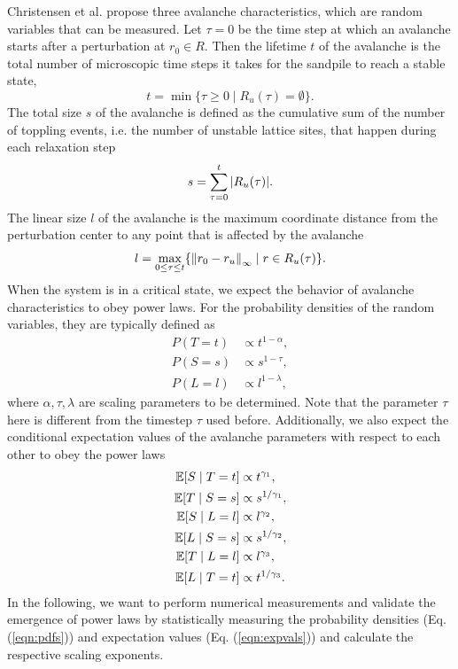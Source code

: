 Christensen et al. \cite{christensen1991dynamical} propose three avalanche characteristics, which are random variables that can be measured. Let $\tau=0$ be the time step at which an avalanche starts after a perturbation at $r_0\in R$. Then the lifetime $t$ of the avalanche is the total number of microscopic time steps it takes for the sandpile to reach a stable state,
\begin{equation}
    t = \min\{\tau\geq0 \mid R_u(\tau) = \emptyset\}.
\end{equation}
The total size $s$ of the avalanche is defined as the cumulative sum of the number of toppling events, i.e. the number of unstable lattice sites, that happen during each relaxation step
\begin{equation}
    s = \sum_{\tau=0}^t \abs{R_u(\tau)}.
\end{equation}
The linear size $l$ of the avalanche is the maximum coordinate distance from the perturbation center to any point that is affected by the avalanche
\begin{equation}
    l = \max_{0\leq\tau\leq t}\{\norm{r_0-r_u}_\infty \mid r\in R_u(\tau)\}.
\end{equation}
When the system is in a critical state, we expect the behavior of avalanche characteristics to obey power laws. For the probability densities of the random variables, they are typically defined as
\begin{align}
    P(T=t) &\propto t^{1-\alpha}, \nonumber \\
    P(S=s) &\propto s^{1-\tau}, \label{eqn:pdfs} \\
    P(L=l) &\propto l^{1-\lambda}, \nonumber
\end{align}
where $\alpha,\tau,\lambda$ are scaling parameters to be determined. Note that the parameter $\tau$ here is different from the timestep $\tau$ used before. Additionally, we also expect the conditional expectation values of the avalanche parameters with respect to each other to obey the power laws
\begin{align}
    \mathbb{E}[S \mid T=t] &\propto t^{\gamma_1}, \nonumber \\
    \mathbb{E}[T \mid S=s] &\propto s^{1/\gamma_1}, \nonumber \\
    \mathbb{E}[S \mid L=l] &\propto l^{\gamma_2}, \nonumber \\
    \mathbb{E}[L \mid S=s] &\propto s^{1/\gamma_2}, \label{eqn:expvals} \\
    \mathbb{E}[T \mid L=l] &\propto l^{\gamma_3}, \nonumber \\
    \mathbb{E}[L \mid T=t] &\propto t^{1/\gamma_3}. \nonumber
\end{align}
In the following, we want to perform numerical measurements and validate the emergence of power laws by statistically measuring the probability densities (Eq. (\ref{eqn:pdfs})) and expectation values (Eq. (\ref{eqn:expvals})) and calculate the respective scaling exponents.
